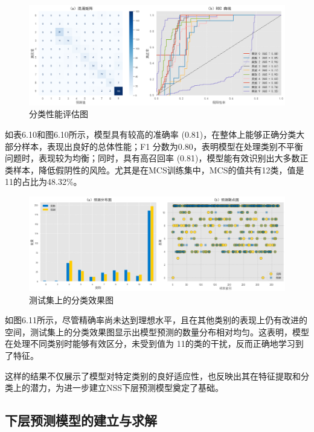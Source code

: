 \begin{figure}[H]
	\centering
	\includegraphics[width=1\linewidth]{figures/问题21预测结果图}
	\caption{分类性能评估图}
	\label{fig:21}
\end{figure}

如表6.10和图6.10所示，模型具有较高的准确率 (0.81)，在整体上能够正确分类大部分样本，表现出良好的总体性能；F1 分数为0.80，表明模型在处理类别不平衡问题时，表现较为均衡；同时，具有高召回率 (0.81)，模型能有效识别出大多数正类样本，降低假阴性的风险。尤其是在MCS训练集中，MCS的值共有12类，值是11的占比为48.32\%。

\begin{figure}[H]
	\centering
	\includegraphics[width=1\linewidth]{"figures/问题22预测结果png (2)"}
	\caption{测试集上的分类效果图}
	\label{fig:22png-2}
\end{figure}


如图6.11所示，尽管精确率尚未达到理想水平，且在其他类别的表现上仍有改进的空间，测试集上的分类效果图显示出模型预测的数量分布相对均匀。这表明，模型在处理不同类别时能够有效区分，未受到值为 11的类的干扰，反而正确地学习到了特征。

这样的结果不仅展示了模型对特定类别的良好适应性，也反映出其在特征提取和分类上的潜力，为进一步建立NSS下层预测模型奠定了基础。



\subsection{下层预测模型的建立与求解}

